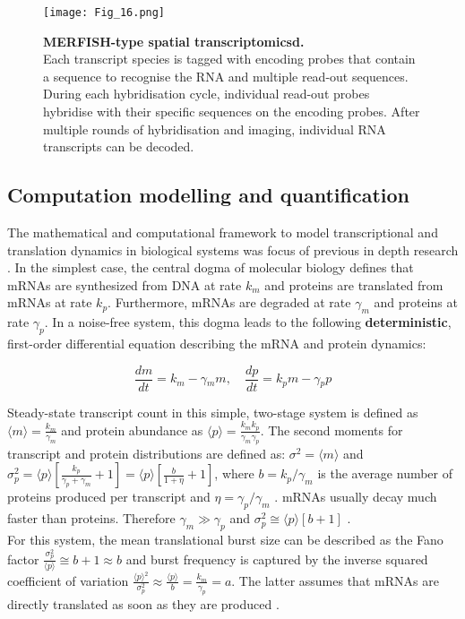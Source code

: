 \begin{figure}[!h]
\centering
\texttt{[image: Fig\_16.png]}
\caption[MERFISH-type spatial transcriptomics]{\textbf{MERFISH-type spatial transcriptomicsd.}\\
Each transcript species is tagged with encoding probes that contain a sequence to recognise the RNA and multiple read-out sequences. During each hybridisation cycle, individual read-out probes hybridise with their specific sequences on the encoding probes. After multiple rounds of hybridisation and imaging, individual RNA transcripts can be decoded.}
\label{fig0:MERFISH}
\end{figure}

\subsection{Computation modelling and quantification}

The mathematical and computational framework to model transcriptional and translation dynamics in biological systems was focus of previous in depth research \citep{Tsimring2014}. In the simplest case, the central dogma of molecular biology defines that mRNAs are synthesized from DNA at rate $k_m$ and proteins are translated from mRNAs at rate $k_p$. Furthermore, mRNAs are degraded at rate $\gamma_m$ and proteins at rate $\gamma_p$. In a noise-free system, this dogma leads to the following \textbf{deterministic}, first-order differential equation describing the mRNA and protein dynamics:

\begin{equation}
\frac{dm}{dt}=k_m-\gamma{}_mm,\quad \frac{dp}{dt}=k_pm-\gamma{}_pp
\end{equation}

\doublespacing
\noindent Steady-state transcript count in this simple, two-stage system is defined as $\langle{}m\rangle{}=\frac{k_m}{\gamma_m}$  and protein abundance as $\langle{}p\rangle{}=\frac{k_mk_p}{\gamma_m\gamma_p }$. The second moments for transcript and protein distributions are defined as: $\sigma^2=\langle{}m\rangle{}$ and $\sigma_p^2=\langle{}p\rangle{}\left[\frac{k_p}{\gamma_p+\gamma_m}+1\right]=\langle{}p\rangle{}\left[\frac{b}{1+\eta}+1\right]$, where $b=k_p/\gamma_m$  is the average number of proteins produced per transcript and $\eta=\gamma_p/\gamma_m$  \citep{Tsimring2014, Thattai2001}. mRNAs usually decay much faster than proteins. Therefore $\gamma_m\gg{}\gamma_p$ and $\sigma_p^2\cong\langle{}p\rangle{}\left[b+1\right]$ \citep{Thattai2001}.\\
For this system, the mean translational burst size can be described as the Fano factor $\frac{\sigma_p^2}{\langle{}p\rangle}\cong{}b+1\approx{}b$ and burst frequency is captured by the inverse squared coefficient of variation $\frac{\langle{}p\rangle{}^2}{\sigma_p^2}\approx{}\frac{\langle{}p\rangle{}}{b}=\frac{k_m}{\gamma_p}=a$. The latter assumes that mRNAs are directly translated as soon as they are produced \citep{Friedman2006}.\\

